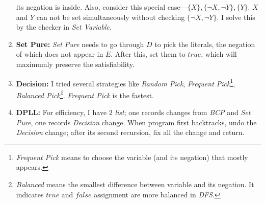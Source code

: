 \documentclass[a4paper,10pt]{article}
\begin{document}
\begin{enumerate}
    its negation is inside.
    Also, consider this special case---$\{X\},\{\neg X,\neg Y\},\{Y\}$. 
    $X$ and $Y$ can not be set simultaneously
    without checking $\{\neg X,\neg Y\}$. 
    I solve this by the checker in \textit{Set Variable}.
\item \textbf{Set Pure:} \textit{Set Pure} needs to go through $D$ to pick the literals,
    the negation of which does not appear in $E$. After this, set them to $true$,
    which will maximumly preserve the satisfiability.
\item \textbf{Decision:} I tried several strategies like
    \textit{Random Pick}, \textit{Frequent
        Pick}\footnote{\textit{Frequent Pick} means to choose the variable (and its negation) that mostly appears.}, \textit{Balanced Pick\footnote{\textit{Balanced} means
    the smallest difference between variable and its negation. It indicates 
    $true$ and $false$ assignment are more balanced in \textit{DFS}.}}. 
    \textit{Frequent Pick} is the fastest.
\item \textbf{DPLL:} For efficiency, I have $2$ \textit{list}; one records changes from \textit{BCP} and
    \textit{Set Pure}, one records \textit{Decision} change. When program first backtracks, undo the \textit{Decision} change; after its second recursion, fix all the change and return.
\end{enumerate}
\vspace{-5pt}
\end{document}
